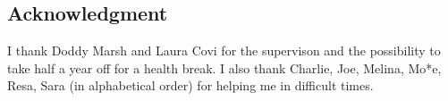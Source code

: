 \documentclass[master,       %
               twoside,        %
               BCOR10mm,       %
               english,ngerman, %
               ]{GAUBM}
\begin{document}
\begin{otherlanguage}{english}


\cleardoublepage


\chapter*{Acknowledgment}
I thank Doddy Marsh and Laura Covi for the supervison and the possibility to take half a year off for a health break.
I also thank Charlie, Joe, Melina, Mo*e, Resa, Sara (in alphabetical order) for helping me in difficult times.

\end{otherlanguage}
\Declaration
\end{document}

